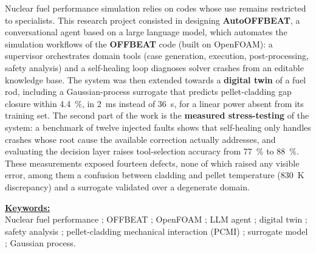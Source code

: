 \documentclass[12pt,a4paper,french]{report}
\begin{document}
\noindent
Nuclear fuel performance simulation relies on codes whose use remains restricted
to specialists. This research project consisted in designing
\textbf{AutoOFFBEAT}, a conversational agent based on a large language model,
which automates the simulation workflows of the \textbf{OFFBEAT} code (built on
OpenFOAM): a supervisor orchestrates domain tools (case generation, execution,
post-processing, safety analysis) and a self-healing loop diagnoses solver
crashes from an editable knowledge base. The system was then extended towards a
\textbf{digital twin} of a fuel rod, including a Gaussian-process surrogate that
predicts pellet-cladding gap closure within \SI{4.4}{\percent}, in
\SI{2}{\milli\second} instead of \SI{36}{\second}, for a linear power absent
from its training set. The second part of the work is the \textbf{measured
stress-testing} of the system: a benchmark of twelve injected faults shows that
self-healing only handles crashes whose root cause the available correction
actually addresses, and evaluating the decision layer raises tool-selection
accuracy from \SI{77}{\percent} to \SI{88}{\percent}. These measurements exposed
fourteen defects, none of which raised any visible error, among them a confusion
between cladding and pellet temperature (\SI{830}{\kelvin} discrepancy) and a
surrogate validated over a degenerate domain.

\vspace{0.35cm}
\noindent\textbf{\underline{Keywords:}}\\[2pt]
Nuclear fuel performance ; OFFBEAT ; OpenFOAM ; LLM agent ; digital twin ;
safety analysis ; pellet-cladding mechanical interaction (PCMI) ;
surrogate model ; Gaussian process.

\clearpage

\renewcommand{\contentsname}{Table des matières}
\setcounter{tocdepth}{1}
\tableofcontents
\clearpage

\renewcommand{\listfigurename}{Table des figures}
\listoffigures
{}
\clearpage
\end{document}
